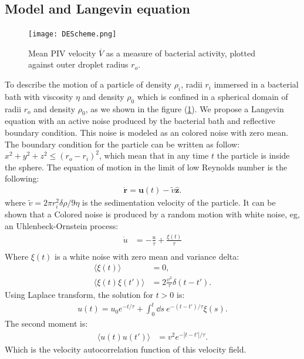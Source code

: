 \documentclass[%
10pt,
superscriptaddress,
twocolumn,
 amsmath,amssymb,
 aps,prx,
]{revtex4-2}
\begin{document}
\subsection*{Model and Langevin equation}
\begin{figure}[!t]
  \texttt{[image: DEScheme.png]}
  \caption{
  Mean PIV velocity $\overline V$ as a measure of bacterial activity, plotted against outer droplet radius $r_o$.
  }
  \label{fig:DE_scheme}
\end{figure}
 To describe the motion of a particle of density $\rho_i$, radii $r_i$ immersed in a bacterial bath with viscosity $\eta$ and density $\rho_0$ which is confined in a spherical domain of radii $r_o$ and density $\rho_0$, as we shown in the figure (\ref{fig:DE_scheme}).
 We propose a Langevin equation with an active noise produced by the bacterial bath and reflective boundary condition. 
 This noise is modeled as an colored noise with zero mean.
 The boundary condition for the particle can be written as follow: $x^2+y^2+z^2\leq (r_o-r_i)^2$, which mean that in any time $t$ the particle is inside the sphere.  
The equation of motion in the limit of low Reynolds number is the following:
\begin{align}
  \label{eq.Langevin_num}
  \mathbf{\dot{r}}=\mathbf{u}(t)-\tilde{v}\mathbf{\hat{z}}.
\end{align}
where  $\tilde{v}=2\pi r_i^2 \delta\rho/9\eta$ is the sedimentation velocity of the particle.
It can be shown that a Colored noise is produced by a random motion with white noise, eg, an Uhlenbeck-Ornstein process:
\begin{align}
  \dot{u}&=-\frac{u}{\tau}+\frac{\xi(t)}{\tau}\\
\end{align}
Where $\xi(t)$ is a white noise with zero mean and variance delta:
\begin{align}
  \langle \xi(t)\rangle &=0,\\
  \langle \xi(t)\xi(t')\rangle &=2\frac{v^2}{\tau}\delta(t-t').
\end{align}
Using Laplace transform, the solution for $t>0$ is:
\begin{align}
  u(t)=u_0e^{-t/\tau}+\int_0^{t} \dd s \ e^{-(t-t')/\tau}\xi(s).
\end{align}
 The second moment is:
\begin{align}
  \langle u(t)u(t')\rangle &=v^2e^{-|t-t'|/\tau}. 
\end{align}
Which is the velocity autocorrelation function of this velocity field.
\end{document}
